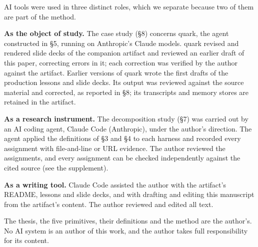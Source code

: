 AI tools were used in three distinct roles, which we separate because two of them are part of the method.

\textbf{As the object of study.} The case study (§8) concerns quark, the agent constructed in §5, running on Anthropic's Claude models. quark revised and rendered slide decks of the companion artifact and reviewed an earlier draft of this paper, correcting errors in it; each correction was verified by the author against the artifact. Earlier versions of quark wrote the first drafts of the production lessons and slide decks. Its output was reviewed against the source material and corrected, as reported in §8; its transcripts and memory stores are retained in the artifact.

\textbf{As a research instrument.} The decomposition study (§7) was carried out by an AI coding agent, Claude Code (Anthropic), under the author's direction. The agent applied the definitions of §3 and §4 to each harness and recorded every assignment with file-and-line or URL evidence. The author reviewed the assignments, and every assignment can be checked independently against the cited source (see the supplement).

\textbf{As a writing tool.} Claude Code assisted the author with the artifact's README, lessons and slide decks, and with drafting and editing this manuscript from the artifact's content. The author reviewed and edited all text.

The thesis, the five primitives, their definitions and the method are the author's. No AI system is an author of this work, and the author takes full responsibility for its content.
